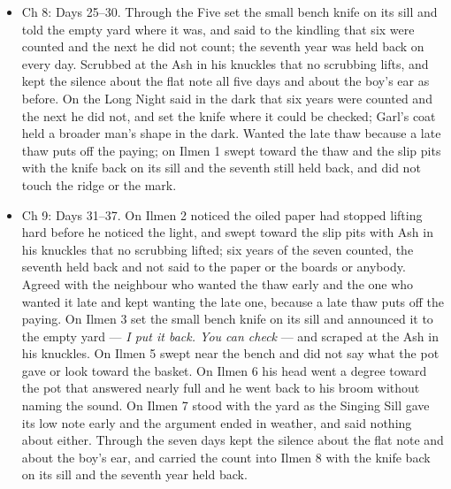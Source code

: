 \documentclass{design/chronicle}
\begin{document}
{\begin{itemize}[leftmargin=1.4em,itemsep=1pt,topsep=3pt,parsep=0pt]
\end{itemize}

\begin{itemize}[leftmargin=1.4em,itemsep=1pt,topsep=3pt,parsep=0pt]

\item Ch 8: Days 25--30. Through the Five set the small bench knife on its sill and told the empty yard where it was, and said to the kindling that six were counted and the next he did not count; the seventh year was held back on every day. Scrubbed at the Ash in his knuckles that no scrubbing lifts, and kept the silence about the flat note all five days and about the boy’s ear as before. On the Long Night said in the dark that six years were counted and the next he did not, and set the knife where it could be checked; Garl’s coat held a broader man’s shape in the dark. Wanted the late thaw because a late thaw puts off the paying; on Ilmen 1 swept toward the thaw and the slip pits with the knife back on its sill and the seventh still held back, and did not touch the ridge or the mark.

\end{itemize}

\begin{itemize}[leftmargin=1.4em,itemsep=1pt,topsep=3pt,parsep=0pt]

\item Ch 9: Days 31–37. On Ilmen 2 noticed the oiled paper had stopped lifting hard before he noticed the light, and swept toward the slip pits with Ash in his knuckles that no scrubbing lifted; six years of the seven counted, the seventh held back and not said to the paper or the boards or anybody. Agreed with the neighbour who wanted the thaw early and the one who wanted it late and kept wanting the late one, because a late thaw puts off the paying. On Ilmen 3 set the small bench knife on its sill and announced it to the empty yard --- \emph{I put it back. You can check} --- and scraped at the Ash in his knuckles. On Ilmen 5 swept near the bench and did not say what the pot gave or look toward the basket. On Ilmen 6 his head went a degree toward the pot that answered nearly full and he went back to his broom without naming the sound. On Ilmen 7 stood with the yard as the Singing Sill gave its low note early and the argument ended in weather, and said nothing about either. Through the seven days kept the silence about the flat note and about the boy’s ear, and carried the count into Ilmen 8 with the knife back on its sill and the seventh year held back.


\end{itemize}}
\end{document}

